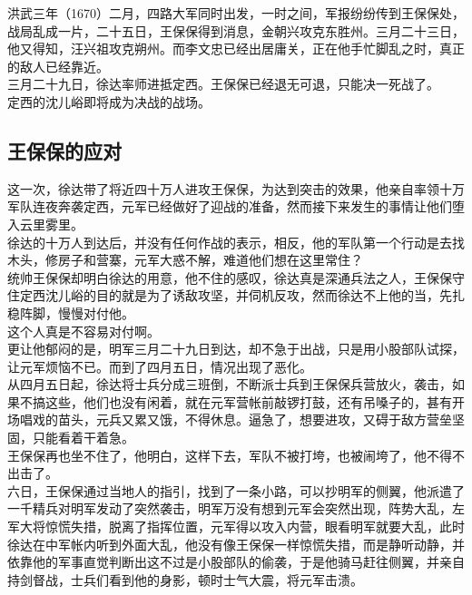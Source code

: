 \begin{multicols}{\theparacolNo}
洪武三年（1670）二月，四路大军同时出发，一时之间，军报纷纷传到王保保处，战局乱成一片，二十五日，王保保得到消息，金朝兴攻克东胜州。三月二十三日，他又得知，汪兴祖攻克朔州。而李文忠已经出居庸关，正在他手忙脚乱之时，真正的敌人已经靠近。\\

三月二十九日，徐达率师进抵定西。王保保已经退无可退，只能决一死战了。\\

定西的沈儿峪即将成为决战的战场。\\

\subsection{王保保的应对}
这一次，徐达带了将近四十万人进攻王保保，为达到突击的效果，他亲自率领十万军队连夜奔袭定西，元军已经做好了迎战的准备，然而接下来发生的事情让他们堕入云里雾里。\\

徐达的十万人到达后，并没有任何作战的表示，相反，他的军队第一个行动是去找木头，修房子和营寨，元军大惑不解，难道他们想在这里常住？\\

统帅王保保却明白徐达的用意，他不住的感叹，徐达真是深通兵法之人，王保保守住定西沈儿峪的目的就是为了诱敌攻坚，并伺机反攻，然而徐达不上他的当，先扎稳阵脚，慢慢对付他。\\

这个人真是不容易对付啊。\\

更让他郁闷的是，明军三月二十九日到达，却不急于出战，只是用小股部队试探，让元军烦恼不已。而到了四月五日，情况出现了恶化。\\

从四月五日起，徐达将士兵分成三班倒，不断派士兵到王保保兵营放火，袭击，如果不搞这些，他们也没有闲着，就在元军营帐前敲锣打鼓，还有吊嗓子的，甚有开场唱戏的苗头，元兵又累又饿，不得休息。逼急了，想要进攻，又碍于敌方营垒坚固，只能看着干着急。\\

王保保再也坐不住了，他明白，这样下去，军队不被打垮，也被闹垮了，他不得不出击了。\\

六日，王保保通过当地人的指引，找到了一条小路，可以抄明军的侧翼，他派遣了一千精兵对明军发动了突然袭击，明军万没有想到元军会突然出现，阵势大乱，左军大将惊慌失措，脱离了指挥位置，元军得以攻入内营，眼看明军就要大乱，此时徐达在中军帐内听到外面大乱，他没有像王保保一样惊慌失措，而是静听动静，并依靠他的军事直觉判断出这不过是小股部队的偷袭，于是他骑马赶往侧翼，并亲自持剑督战，士兵们看到他的身影，顿时士气大震，将元军击溃。\\


\end{multicols}
